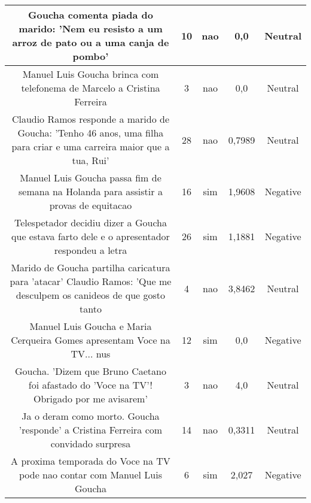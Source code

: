 \documentclass[11pt]{article}
\newlength\mylength
\begin{document}
\begin{center}
\begin{longtable}{||C{.40\mylength}||C{.20\mylength}||C{.20\mylength}||C{.30\mylength}||C{.20\mylength}||}
   Goucha comenta piada do marido: 'Nem eu resisto a um arroz de pato ou a uma canja de pombo'  & 10 & nao & 0,0 & Neutral \\  \hline
   Manuel Luis Goucha brinca com telefonema de Marcelo a Cristina Ferreira  & 3 & nao & 0,0 & Neutral \\  \hline
   Claudio Ramos responde a marido de Goucha: 'Tenho 46 anos, uma filha para criar e uma carreira maior que a tua, Rui'  & 28 & nao & 0,7989 & Neutral \\  \hline
   Manuel Luis Goucha passa fim de semana na Holanda para assistir a provas de equitacao  & 16 & sim & 1,9608 & Negative \\  \hline
   Telespetador decidiu dizer a Goucha que estava farto dele e o apresentador respondeu a letra  & 26 & sim & 1,1881 & Negative \\  \hline
   Marido de Goucha partilha caricatura para 'atacar' Claudio Ramos: 'Que me desculpem os canideos de que gosto tanto & 4 & nao & 3,8462 & Neutral \\  \hline
   Manuel Luis Goucha e Maria Cerqueira Gomes apresentam Voce na TV... nus  & 12 & sim & 0,0 & Negative \\  \hline
   Goucha. 'Dizem que Bruno Caetano foi afastado do 'Voce na TV'! Obrigado por me avisarem' & 3 & nao & 4,0 & Neutral \\  \hline
   Ja o deram como morto. Goucha 'responde' a Cristina Ferreira com convidado surpresa  & 14 & nao & 0,3311 & Neutral \\  \hline
   A proxima temporada do Voce na TV pode nao contar com Manuel Luis Goucha  & 6 & sim & 2,027 & Negative \\  \hline

\end{longtable}
\end{center}
\end{document}
